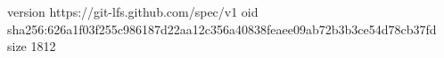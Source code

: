 version https://git-lfs.github.com/spec/v1
oid sha256:626a1f03f255c986187d22aa12c356a40838feaee09ab72b3b3ce54d78cb37fd
size 1812

